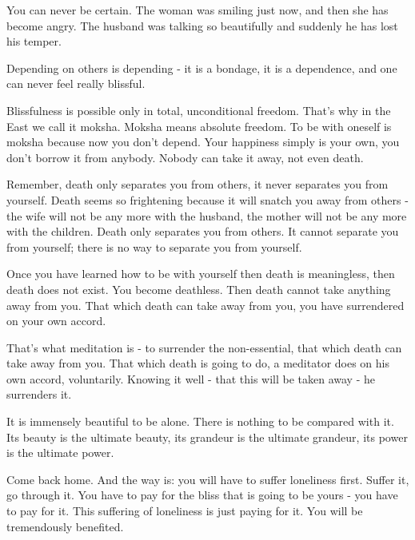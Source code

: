 You can never be certain. The woman was smiling just now, and then she has become angry. The husband was talking so beautifully and suddenly he has lost his temper.

Depending on others is depending - it is a bondage, it is a dependence, and one can never feel really blissful.

Blissfulness is possible only in total, unconditional freedom. That's why in the East we call it moksha. Moksha means absolute freedom. To be with oneself is moksha because now you don't depend. Your happiness simply is your own, you don't borrow it from anybody. Nobody can take it away, not even death.

Remember, death only separates you from others, it never separates you from yourself. Death seems so frightening because it will snatch you away from others - the wife will not be any more with the husband, the mother will not be any more with the children. Death only separates you from others. It cannot separate you from yourself; there is no way to separate you from yourself.

Once you have learned how to be with yourself then death is meaningless, then death does not exist. You become deathless. Then death cannot take anything away from you. That which death can take away from you, you have surrendered on your own accord.

That's what meditation is - to surrender the non-essential, that which death can take away from you. That which death is going to do, a meditator does on his own accord, voluntarily. Knowing it well - that this will be taken away - he surrenders it.

It is immensely beautiful to be alone. There is nothing to be compared with it. Its beauty is the ultimate beauty, its grandeur is the ultimate grandeur, its power is the ultimate power.

Come back home. And the way is: you will have to suffer loneliness first. Suffer it, go through it. You have to pay for the bliss that is going to be yours - you have to pay for it. This suffering of loneliness is just paying for it. You will be tremendously benefited.

